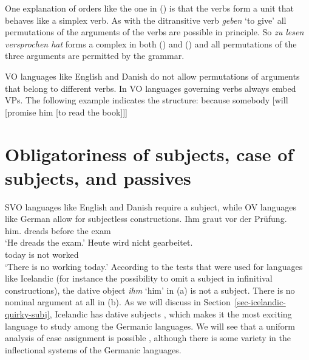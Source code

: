 One explanation of orders like the one in () is that the verbs form a unit that behaves like a simplex verb. As with
the ditransitive verb \emph{geben} `to give' all permutations of the arguments of the verbs are
possible in principle. So \emph{zu lesen versprochen hat} forms a complex in both () and
() and all permutations of the three arguments are permitted by the grammar.

VO languages like English and Danish do not allow permutations of arguments that belong to different
verbs. In VO languages governing verbs always embed VPs. The following example indicates the
structure:
\ea
because somebody [will [promise him [to read the book]]]
\z



\section{Obligatoriness of subjects, case of subjects, and passives}

SVO languages like English and Danish require a subject, while OV languages like German allow for
subjectless constructions.
\eal
\ex 
\gll Ihm graut vor der Prüfung.\\
     him.\DAT{} dreads before the exam\\\german
\glt `He dreads the exam.'
\ex 
\gll Heute wird nicht gearbeitet.\\
     today is   not worked\\
\glt `There is no working today.'
\zl
According to the tests that were used for languages like Icelandic (for instance the possibility to
omit a subject in infinitival constructions), the dative object \emph{ihm} `him' in (a) is
not a subject. There is no nominal argument at all in (b). As we will discuss in
Section~\ref{sec-icelandic-quirky-subj}, Icelandic has dative subjects \citep{ZMT85a}, which makes it the most
exciting language to study among the Germanic languages. We will see that a uniform analysis of case
assignment is possible \citep*{YMJ87}, although there is some variety in the inflectional systems of the Germanic languages.


